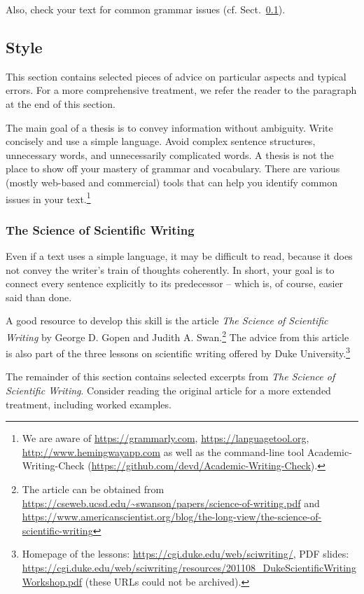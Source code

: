 Also, check your text for common grammar issues (cf. Sect.~\ref{sec:style}).

\subsection{Style}
\label{sec:style}

This section contains selected pieces of advice on particular aspects and typical errors. For a more comprehensive treatment, we refer the reader to the paragraph  at the end of this section.

The main goal of a thesis is to convey information without ambiguity. Write concisely and use a simple language. Avoid complex sentence structures, unnecessary words, and unnecessarily complicated words. A thesis is not the place to show off your mastery of grammar and vocabulary. There are various (mostly web-based and commercial) tools that can help you identify common issues in your text.\footnote{We are aware of \url{https://grammarly.com}, \url{https://languagetool.org}, \url{http://www.hemingwayapp.com} as well as the command-line tool Academic-Writing-Check (\url{https://github.com/devd/Academic-Writing-Check}).}


\subsubsection{The Science of Scientific Writing}

Even if a text uses a simple language, it may be difficult to read, because it does not convey the writer's train of thoughts coherently. In short, your goal is to connect every sentence explicitly to its predecessor – which is, of course, easier said than done.

A good resource to develop this skill is the article \emph{The Science of Scientific Writing} by George D. Gopen and Judith A. Swan.\footnote{The article can be obtained from \url{https://cseweb.ucsd.edu/~swanson/papers/science-of-writing.pdf} and \url{https://www.americanscientist.org/blog/the-long-view/the-science-of-scientific-writing}} 
The advice from this article is also part of the three lessons on scientific writing offered by Duke University.\footnote{Homepage of the lessons: \url{https://cgi.duke.edu/web/sciwriting/}, PDF slides: \url{https://cgi.duke.edu/web/sciwriting/resources/201108_DukeScientificWritingWorkshop.pdf} (these URLs could not be archived).}

The remainder of this section contains selected excerpts from \emph{The Science of Scientific Writing}. Consider reading the original article for a more extended treatment, including worked examples.

